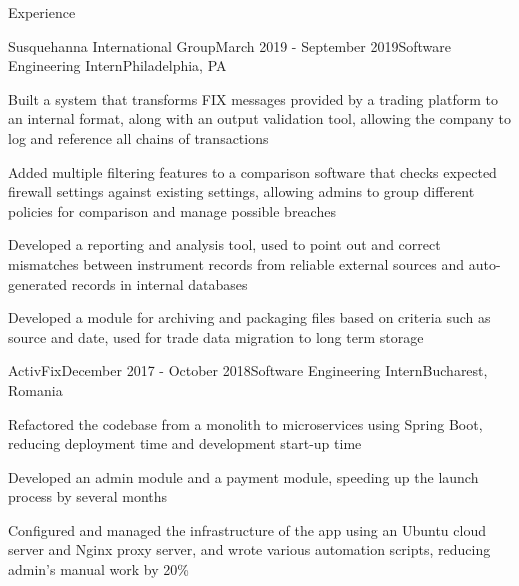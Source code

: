\documentclass{resume} %
\begin{document}
\begin{rSection}{Experience}

\begin{rSubsection}{Susquehanna International Group}{March 2019 - September 2019}{Software Engineering Intern}{Philadelphia, PA}
\item Built a system that transforms FIX messages provided by a trading platform to an internal format, along with an output validation tool, allowing the company to log and reference all chains of transactions
\item Added multiple filtering features to a comparison software that checks expected firewall settings against existing settings, allowing admins to group different policies for comparison and manage possible breaches
\item Developed a reporting and analysis tool, used to point out and correct mismatches between instrument records from reliable external sources and auto-generated records in internal databases
\item Developed a module for archiving and packaging files based on criteria such as source and date, used for trade data migration to long term storage
\end{rSubsection}


\begin{rSubsection}{ActivFix}{December 2017 - October 2018}{Software Engineering Intern}{Bucharest, Romania}
\item Refactored the codebase from a monolith to microservices using Spring Boot, reducing deployment time and development start-up time
\item Developed an admin module and a payment module, speeding up the launch process by several months
\item Configured and managed the infrastructure of the app using an Ubuntu cloud server and Nginx proxy server, and wrote various automation scripts, reducing admin's manual work by 20\%
\end{rSubsection}

\end{rSection}

\end{document}
